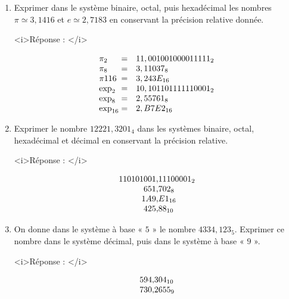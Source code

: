 \begin{enumerate} [label=\arabic*$^\circ$]

\item Exprimer dans le système binaire, octal, puis hexadécimal les nombres $\pi \simeq 3,1416$ et $e \simeq 2,7183$ en conservant la précision relative donnée. 

<i>Réponse : </i>

\medskip

\[
\begin{array}{l@{\hspace*{1mm}}cl}
\pi_2    & = & 11,001001000011111_2 \\
\pi_8    & = & 3,11037_8 \\
\pi1{16} & = & 3,243E_{16} \\
\exp_2   & = & 10, 101101111110001_2 \\
\exp_8   & = & 2,55761_8\\
\exp_{16} & = & 2,B7E2_{16} \\   
\end{array}
\]

\medskip 

\item Exprimer le nombre $12221,3201_4$ dans les systèmes binaire, octal, hexadécimal et décimal en conservant la précision relative. 

<i>Réponse : </i>
\medskip

\[
\begin{array}{r@{\hspace*{0mm}}l}
     110101001,&11100001_2\\
     651,&702_8 \\
     1A9,&E1_{16} \\
     425,&88_{10}\\       
\end{array}
\]

\medskip 


\item On donne dans le système à base « $5$ » le nombre $4334,123_5$. Exprimer ce nombre dans le système décimal, puis dans le système à base « $9$ ».


<i>Réponse : </i>
\medskip

\[
\begin{array}{r@{\hspace*{0mm}}l}
     594,& 304_{10}\\
     730,&2655_9\\    
\end{array}
\]


\end{enumerate}
